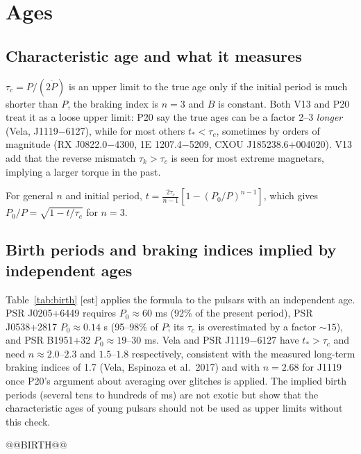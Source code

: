 \documentclass[11pt,a4paper]{article}
\newcommand{\src}[1]{\textsf{[#1]}}
\begin{document}
\section{Ages}\label{sec:ages}
\subsection{Characteristic age and what it measures}
$\tau_c=P/(2\dot P)$ is an upper limit to the true age only if the initial period is much shorter than $P$, the braking index is $n=3$ and $B$ is constant. Both V13 and P20 treat it as a loose upper limit: P20 say the true ages can be a factor 2--3 \emph{longer} (Vela, J1119$-$6127), while for most others $t_*<\tau_c$, sometimes by orders of magnitude (RX J0822.0$-$4300, 1E 1207.4$-$5209, CXOU J185238.6+004020). V13 add that the reverse mismatch $\tau_k>\tau_c$ is seen for most extreme magnetars, implying a larger torque in the past.

For general $n$ and initial period, $t=\frac{2\tau_c}{n-1}\left[1-(P_0/P)^{n-1}\right]$, which gives $P_0/P=\sqrt{1-t/\tau_c}$ for $n=3$.

\subsection{Birth periods and braking indices implied by independent ages}
Table~\ref{tab:birth} \src{est} applies the formula to the pulsars with an independent age. PSR J0205+6449 requires $P_0\approx60$ ms (92\% of the present period), PSR J0538+2817 $P_0\approx0.14$ s (95--98\% of $P$; its $\tau_c$ is overestimated by a factor $\sim15$), and PSR B1951+32 $P_0\approx19$--$30$ ms. Vela and PSR J1119$-$6127 have $t_*>\tau_c$ and need $n\approx2.0$--$2.3$ and $1.5$--$1.8$ respectively, consistent with the measured long-term braking indices of 1.7 (Vela, Espinoza et al.\ 2017) and with $n=2.68$ for J1119 once P20's argument about averaging over glitches is applied. The implied birth periods (several tens to hundreds of ms) are not exotic but show that the characteristic ages of young pulsars should not be used as upper limits without this check.

@@BIRTH@@
\end{document}
